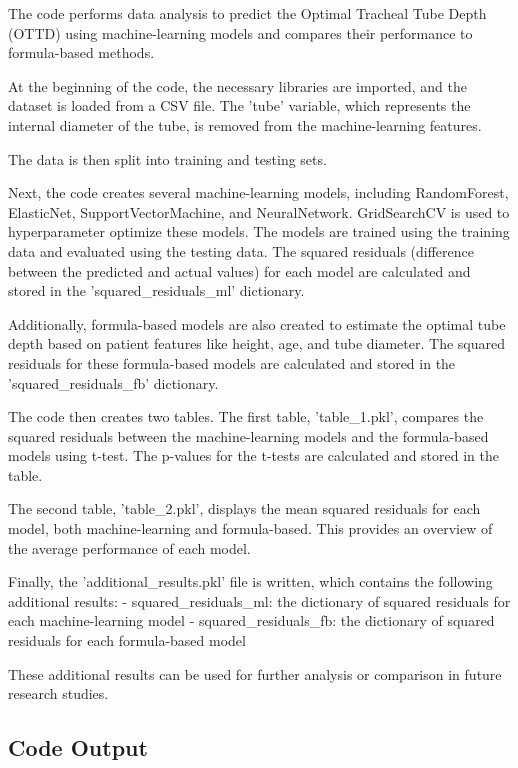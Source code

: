 \documentclass[11pt]{article}
\begin{document}
The code performs data analysis to predict the Optimal Tracheal Tube Depth (OTTD) using machine-learning models and compares their performance to formula-based methods. 

At the beginning of the code, the necessary libraries are imported, and the dataset is loaded from a CSV file. The 'tube' variable, which represents the internal diameter of the tube, is removed from the machine-learning features. 

The data is then split into training and testing sets. 

Next, the code creates several machine-learning models, including RandomForest, ElasticNet, SupportVectorMachine, and NeuralNetwork. GridSearchCV is used to hyperparameter optimize these models. The models are trained using the training data and evaluated using the testing data. The squared residuals (difference between the predicted and actual values) for each model are calculated and stored in the 'squared\_residuals\_ml' dictionary.

Additionally, formula-based models are also created to estimate the optimal tube depth based on patient features like height, age, and tube diameter. The squared residuals for these formula-based models are calculated and stored in the 'squared\_residuals\_fb' dictionary.

The code then creates two tables. The first table, 'table\_1.pkl', compares the squared residuals between the machine-learning models and the formula-based models using t-test. The p-values for the t-tests are calculated and stored in the table.

The second table, 'table\_2.pkl', displays the mean squared residuals for each model, both machine-learning and formula-based. This provides an overview of the average performance of each model.

Finally, the 'additional\_results.pkl' file is written, which contains the following additional results:
- squared\_residuals\_ml: the dictionary of squared residuals for each machine-learning model
- squared\_residuals\_fb: the dictionary of squared residuals for each formula-based model

These additional results can be used for further analysis or comparison in future research studies.

\subsection{Code Output}\hypertarget{file-table-1-pkl}{}
\end{document}
